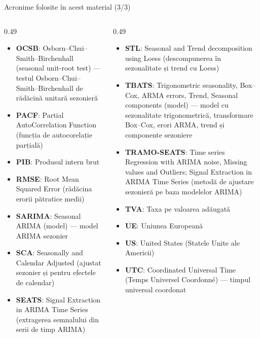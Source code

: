 \begin{frame}{Acronime folosite în acest material (3/3)}
\begin{columns}[T]
\begin{column}{0.49\textwidth}
\begin{itemize}\setlength{\itemsep}{0pt}
    \item \textbf{OCSB}: Osborn–Chui–Smith–Birchenhall (seasonal unit-root test) — testul Osborn–Chui–Smith–Birchenhall de rădăcină unitară sezonieră
    \item \textbf{PACF}: Partial AutoCorrelation Function (funcția de autocorelație parțială)
    \item \textbf{PIB}: Produsul intern brut
    \item \textbf{RMSE}: Root Mean Squared Error (rădăcina erorii pătratice medii)
    \item \textbf{SARIMA}: Seasonal ARIMA (model) — model ARIMA sezonier
    \item \textbf{SCA}: Seasonally and Calendar Adjusted (ajustat sezonier și pentru efectele de calendar)
    \item \textbf{SEATS}: Signal Extraction in ARIMA Time Series (extragerea semnalului din serii de timp ARIMA)
\end{itemize}
\end{column}
\begin{column}{0.49\textwidth}
\begin{itemize}\setlength{\itemsep}{0pt}
    \item \textbf{STL}: Seasonal and Trend decomposition using Loess (descompunerea în sezonalitate și trend cu Loess)
    \item \textbf{TBATS}: Trigonometric seasonality, Box–Cox, ARMA errors, Trend, Seasonal components (model) — model cu sezonalitate trigonometrică, transformare Box–Cox, erori ARMA, trend și componente sezoniere
    \item \textbf{TRAMO-SEATS}: Time series Regression with ARIMA noise, Missing values and Outliers; Signal Extraction in ARIMA Time Series (metodă de ajustare sezonieră pe baza modelelor ARIMA)
    \item \textbf{TVA}: Taxa pe valoarea adăugată
    \item \textbf{UE}: Uniunea Europeană
    \item \textbf{US}: United States (Statele Unite ale Americii)
    \item \textbf{UTC}: Coordinated Universal Time (Temps Universel Coordonné) — timpul universal coordonat
\end{itemize}
\end{column}
\end{columns}
\end{frame}

